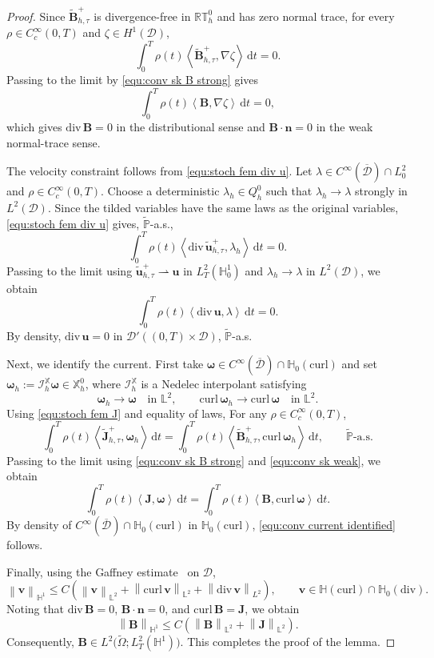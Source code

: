 \documentclass[11pt, reqno]{amsart}
\theoremstyle{definition}
\numberwithin{equation}{section}
\newcommand{\curl}{\mathrm{curl}\,}
\newcommand{\divg}{\mathrm{div}\,}
\newcommand{\bff}{\boldsymbol}
\newcommand{\bb}{\mathbb}
\newcommand{\dt}{\,\mathrm{d}t}
\newcommand{\norm}[2]{\left\|{#1}\right\|_{#2}}
\newcommand{\inpro}[2]{\left\langle#1,#2\right\rangle}
\newcommand{\hcurl}{\mathbb{H}(\mathrm{curl})}
\newcommand{\hzerodiv}{\mathbb{H}_0(\mathrm{div})}
\newcommand{\hzerocurl}{\mathbb{H}_0(\mathrm{curl})}
\begin{document}
\begin{proof}
	Since $\widetilde{\bff B}_{h,\tau}^{+}$ is divergence-free in
	$\bb{RT}_h^0$ and has zero normal trace, for every $\rho\in C_c^\infty(0,T)$ and $\zeta\in H^1(\mathscr D)$,
	\[
	\int_0^T \rho(t)
	\inpro{\widetilde{\bff B}_{h,\tau}^{+}}{\nabla\zeta}\dt=0.
	\]
	Passing to the limit by \eqref{equ:conv sk B strong} gives
	\[
	\int_0^T \rho(t)
	\inpro{\bff B}{\nabla\zeta}\dt=0,
	\]
	which gives $\divg\bff B=0$ in the distributional sense and $\bff B\cdot\bff n=0$ in the weak
	normal-trace sense.
	
	The velocity constraint follows from \eqref{equ:stoch fem div u}. Let
	$\lambda\in C^\infty(\overline{\mathscr D})\cap L^2_0$ and $\rho\in C_c^\infty(0,T)$.
	Choose a deterministic $\lambda_h\in Q_h^0$ such that
	$\lambda_h\to\lambda$ strongly in $L^2(\mathscr D)$. Since the tilded
	variables have the same laws as the original variables, \eqref{equ:stoch fem div u}
	gives, $\widetilde{\bb P}$-a.s.,
	\[
	\int_0^T \rho(t)
	\inpro{\divg\widetilde{\bff u}_{h,\tau}^{+}}{\lambda_h}\dt
	=0 .
	\]
	Passing to the limit using
	$\widetilde{\bff u}_{h,\tau}^{+}\rightharpoonup\bff u$ in
	$L^2_T(\bb H_0^1)$ and $\lambda_h\to\lambda$ in $L^2(\mathscr D)$, we obtain
	\[
	\int_0^T \rho(t)
	\inpro{\divg\bff u}{\lambda}\dt
	=0 .
	\]
	By density, $\divg\bff u=0$ in $\mathcal D'((0,T)\times\mathscr D)$,
	$\widetilde{\bb P}$-a.s.
	
	Next, we identify the current. First take
	$\bff\omega\in C^\infty(\overline{\mathscr D})\cap\hzerocurl$ and set
	$\bff\omega_h:=\mathcal I_h^{\bb X}\bff\omega\in\bb X_h^0$,
	where $\mathcal I_h^{\bb X}$ is a Nedelec interpolant satisfying
	\[
	\bff\omega_h\to\bff\omega
	\quad\text{in }\bb L^2,
	\qquad
	\curl\bff\omega_h\to\curl\bff\omega
	\quad\text{in }\bb L^2.
	\]
	Using \eqref{equ:stoch fem J} and equality of laws, For any $\rho\in C_c^\infty(0,T)$,
	\[
	\int_0^T \rho(t)
	\inpro{\widetilde{\bff J}_{h,\tau}^{+}}{\bff\omega_h}\dt
	=
	\int_0^T \rho(t)
	\inpro{\widetilde{\bff B}_{h,\tau}^{+}}{\curl\bff\omega_h}\dt,
	\qquad \widetilde{\bb P}\text{-a.s.}
	\]
	Passing to the limit using \eqref{equ:conv sk B strong} and
	\eqref{equ:conv sk weak}, we obtain
	\[
	\int_0^T \rho(t)
	\inpro{\bff J}{\bff\omega}\dt
	=
	\int_0^T \rho(t)
	\inpro{\bff B}{\curl\bff\omega}\dt.
	\]
	By density of
	$C^\infty(\overline{\mathscr D})\cap\hzerocurl$ in $\hzerocurl$,
	\eqref{equ:conv current identified} follows.
	
	Finally, using the Gaffney estimate~\cite{AmrBerDauGir98} on $\mathscr D$,
	\[
	\norm{\bff v}{\bb H^1}
	\le
	C\left(
	\norm{\bff v}{\bb L^2}
	+
	\norm{\curl\bff v}{\bb L^2}
	+
	\norm{\divg\bff v}{L^2}
	\right),
	\qquad
	\bff v\in \hcurl \cap \hzerodiv.
	\]
	Noting that $\divg\bff B=0$, $\bff B\cdot\bff n=0$, and
	$\curl\bff B=\bff J$, we obtain
	\[
	\norm{\bff B}{\bb H^1}
	\le
	C\left(
	\norm{\bff B}{\bb L^2}
	+
	\norm{\bff J}{\bb L^2}
	\right).
	\]
	Consequently, $\bff B\in
	L^2\bigl(\widetilde\Omega;L^2_T(\bb H^1)\bigr)$. This completes the proof of the lemma.
\end{proof}
\end{document}
